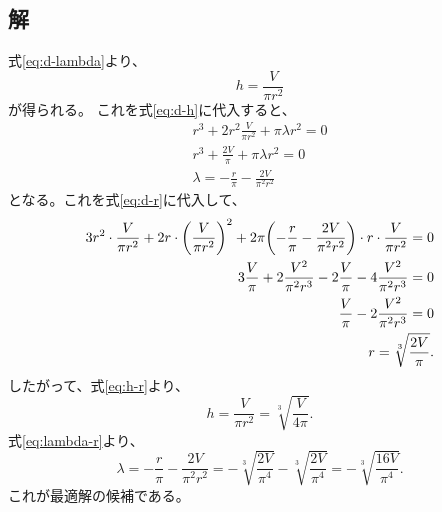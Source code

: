 \documentclass{jsarticle}
\begin{document}
\subsection{解}
式\eqref{eq:d-lambda}より、
\begin{equation}
  h=\frac{V}{\pi r^2}
  \label{eq:h-r}
\end{equation}
が得られる。
これを式\eqref{eq:d-h}に代入すると、
\begin{align}
  r^3 + 2r^2\frac{V}{\pi r^2} + \pi\lambda r^2 = 0 \\
  r^3 + \frac{2V}{\pi} + \pi\lambda r^2 = 0 \\
  \lambda = -\frac{r}{\pi} - \frac{2V}{\pi^2 r^2}
  \label{eq:lambda-r}
\end{align}
となる。これを式\eqref{eq:d-r}に代入して、
\begin{align}
  3r^2\cdot\frac{V}{\pi r^2} 
  + 2r\cdot\qty(\frac{V}{\pi r^2})^2 
  + 2\pi\qty(
    -\frac{r}{\pi} - \frac{2V}{\pi^2 r^2}
    )
    \cdot r\cdot
    \frac{V}{\pi r^2} = 0 \\
  3\frac{V}{\pi} 
  + 2\frac{V^2}{\pi^2 r^3} 
  - 2\frac{V}{\pi}
  - 4\frac{V^2}{\pi^2 r^3} = 0 \\
  \frac{V}{\pi} - 2\frac{V^2}{\pi^2 r^3} = 0 \\
  r = \sqrt[3]{\frac{2V}{\pi}}.
\end{align}
したがって、式\eqref{eq:h-r}より、
\begin{equation}
  h = \frac{V}{\pi r^2} 
  = \sqrt[3]{\frac{V}{4\pi}}.
\end{equation}
式\eqref{eq:lambda-r}より、
\begin{equation}
  \lambda = -\frac{r}{\pi} - \frac{2V}{\pi^2 r^2} 
  = -\sqrt[3]{\frac{2V}{\pi^4}} - \sqrt[3]{\frac{2V}{\pi^4}} 
  = -\sqrt[3]{\frac{16V}{\pi^4}}.
\end{equation}
これが最適解の候補である。
\end{document}
